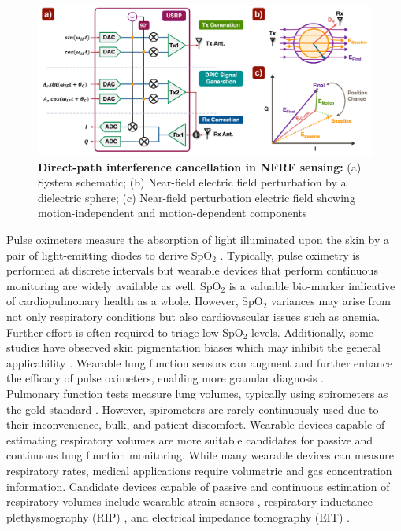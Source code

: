 \documentclass[journal,twoside,web]{ieeecolor}
\begin{document}
\begin{figure}[t]
\centering
\includegraphics[width=.95\textwidth]{setup_dpic_v5.jpg}
\caption{\textbf{Direct-path interference cancellation in NFRF sensing:} (a) System schematic; (b) Near-field electric field perturbation by a dielectric sphere; (c) Near-field perturbation electric field showing motion-independent and motion-dependent components}
\label{fig:dpic}
\end{figure}
\hspace{-0.5em}Pulse oximeters measure the absorption of light illuminated upon the skin by a pair of light-emitting diodes to derive SpO$_2$ \cite{jubranPulseOximetry2015}. Typically, pulse oximetry is performed at discrete intervals but wearable devices that perform continuous monitoring are widely available as well. SpO$_2$ is a valuable bio-marker indicative of cardiopulmonary health as a whole. However, SpO$_2$ variances may arise from not only respiratory conditions but also cardiovascular issues such as anemia. Further effort is often required to triage low SpO$_2$ levels. Additionally, some studies have observed skin pigmentation biases which may inhibit the general applicability \cite{cabanasSkinPigmentationInfluence2022}. Wearable lung function sensors can augment and further enhance the efficacy of pulse oximeters, enabling more granular diagnosis \cite{buekersWearableFingerPulse2019}\cite{buekersOxygenSaturationMeasurements2018}. \\
Pulmonary function tests measure lung volumes, typically using spirometers as the gold standard \cite{poncePulmonaryFunctionTests2024}. However, spirometers are rarely continuously used due to their inconvenience, bulk, and patient discomfort. Wearable devices capable of estimating respiratory volumes are more suitable candidates for passive and continuous lung function monitoring. While many wearable devices can measure respiratory rates, medical applications require volumetric and gas concentration information. Candidate devices capable of passive and continuous estimation of respiratory volumes include wearable strain sensors \cite{chuRespirationRateVolume2019}, respiratory inductance plethysmography (RIP) \cite{vitazkovaAdvancesRespiratoryMonitoring2024}, and electrical impedance tomography (EIT) \cite{adlerMonitoringChangesLung1997}. \\
\end{document}
